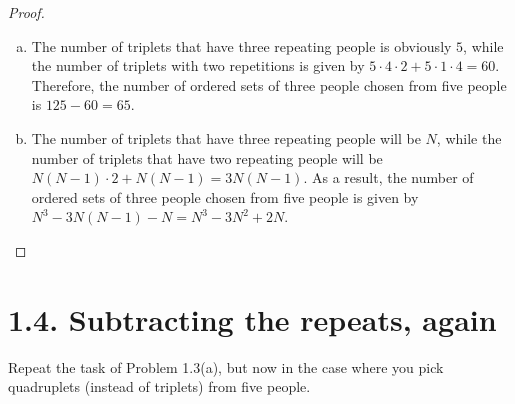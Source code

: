 \vspace{1em}

\begin{proof}
    \hfill
    \begin{enumerate}[(a)]
        \item The number of triplets that have three repeating people is obviously $5$, while the number of 
            triplets with two repetitions is given by $5 \cdot 4 \cdot 2 + 5 \cdot 1 \cdot 4 = 60$. 
            Therefore, the number of ordered sets of three people chosen from five people is $125 - 60 = 65$.

        \item The number of triplets that have three repeating people will be $N$, while the number of triplets
            that have two repeating people will be $N(N - 1) \cdot 2 + N(N - 1) = 3N(N-1)$. As a result,
            the number of ordered sets of three people chosen from five people is given by
            $N^3 - 3N(N - 1) - N = N^3 - 3N^2 + 2N$.
    \end{enumerate}
\end{proof}

\section*{1.4. Subtracting the repeats, again}
Repeat the task of Problem 1.3(a), but now in the case where you pick quadruplets (instead of triplets)
from five people.

\vspace{1em}

